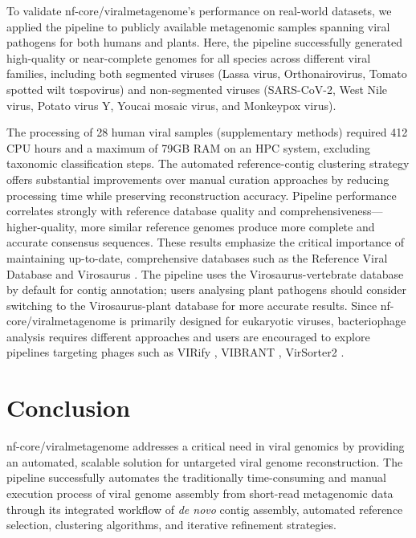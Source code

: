 To validate nf-core/viralmetagenome's performance on real-world datasets, we applied the pipeline to publicly available metagenomic samples spanning viral pathogens for both humans and plants. Here, the pipeline successfully generated high-quality or near-complete genomes for all species across different viral families, including both segmented viruses (Lassa virus, Orthonairovirus, Tomato spotted wilt tospovirus) and non-segmented viruses (SARS-CoV-2, West Nile virus, Potato virus Y, Youcai mosaic virus,  and Monkeypox virus).

The processing of 28 human viral samples (supplementary methods) required 412 CPU hours and a maximum of 79GB RAM on an HPC system, excluding taxonomic classification steps. The automated reference-contig clustering strategy offers substantial improvements over manual curation approaches by reducing processing time while preserving reconstruction accuracy. Pipeline performance correlates strongly with reference database quality and comprehensiveness—higher-quality, more similar reference genomes produce more complete and accurate consensus sequences. These results emphasize the critical importance of maintaining up-to-date, comprehensive databases such as the Reference Viral Database \cite{Goodacre2018-dw} and Virosaurus \cite{Gleizes2020-rq}. The pipeline uses the Virosaurus-vertebrate database by default for contig annotation; users analysing plant pathogens should consider switching to the Virosaurus-plant database for more accurate results. Since nf-core/viralmetagenome is primarily designed for eukaryotic viruses, bacteriophage analysis requires different approaches and users are encouraged to explore pipelines targeting phages such as VIRify \cite{Rangel-Pineros2022-wv}, VIBRANT \cite{Kieft2020-aq}, VirSorter2 \cite{Guo2021-rf}.


\section{Conclusion}

nf-core/viralmetagenome addresses a critical need in viral genomics by providing an automated, scalable solution for untargeted viral genome reconstruction. The pipeline successfully automates the traditionally time-consuming and manual execution process of viral genome assembly from short-read metagenomic data through its integrated workflow of \textit{de novo} contig assembly, automated reference selection, clustering algorithms, and iterative refinement strategies.

